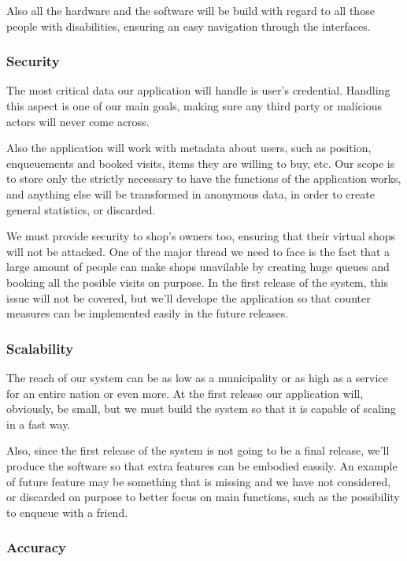 Also all the hardware and the software will be build with regard to all those people with disabilities, ensuring an easy navigation through the interfaces.

\subsubsection{Security}
\label{subsubsect:security}

The most critical data our application will handle is user's credential. Handling this aspect is one of our main goals, making sure any third party or malicious actors will never come across. 

Also the application will work with metadata about users, such as position, enqueuements and booked visits, items they are willing to buy, etc. Our scope is to store only the strictly necessary to have the functions of the application works, and anything else will be transformed in anonymous data, in order to create general statistics, or discarded.

We must provide security to shop's owners too, ensuring that their virtual shops will not be attacked. One of the major thread we need to face is the fact that a large amount of people can make shops unavilable by creating huge queues and booking all the posible visits on purpose. In the first release of the system, this issue will not be covered, but we'll develope the application so that counter measures can be implemented easily in the future releases.

\subsubsection{Scalability}
\label{subsubsect:scalability}

The reach of our system can be as low as a municipality or as high as a service for an entire nation or even more. At the first release our application will, obviously, be small, but we must build the system so that it is capable of scaling in a fast way.

Also, since the first release of the system is not going to be a final release, we'll produce the software so that extra features can be embodied eassily. An example of future feature may be something that is missing and we have not considered, or discarded on purpose to better focus on main functions, such as the possibility to enqueue with a friend.

\subsubsection{Accuracy}
\label{subsubsect:accuracy}

